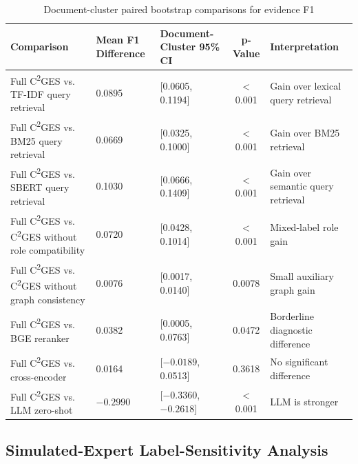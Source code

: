 \documentclass{article}
\begin{document}
\begin{table}[!ht]

\caption{Document-cluster paired bootstrap comparisons for evidence F1}
\label{tab:bootstrap}
\begin{tabular}{lllcl}
\toprule
\textbf{Comparison} & \textbf{Mean F1 Difference} & \textbf{Document-Cluster 95\% CI} & \textbf{p-Value} & \textbf{Interpretation} \\
\midrule
Full C\textsuperscript{2}GES vs. TF-IDF query retrieval & 0.0895 & [0.0605, 0.1194] & $<$0.001 & Gain over lexical query retrieval \\
Full C\textsuperscript{2}GES vs. BM25 query retrieval & 0.0669 & [0.0325, 0.1000] & $<$0.001 & Gain over BM25 retrieval \\
Full C\textsuperscript{2}GES vs. SBERT query retrieval & 0.1030 & [0.0666, 0.1409] & $<$0.001 & Gain over semantic query retrieval \\
Full C\textsuperscript{2}GES vs. C\textsuperscript{2}GES without role compatibility & 0.0720 & [0.0428, 0.1014] & $<$0.001 & Mixed-label role gain \\
Full C\textsuperscript{2}GES vs. C\textsuperscript{2}GES without graph consistency & 0.0076 & [0.0017, 0.0140] & 0.0078 & Small auxiliary graph gain \\
Full C\textsuperscript{2}GES vs. BGE reranker & 0.0382 & [0.0005, 0.0763] & 0.0472 & Borderline diagnostic difference \\
Full C\textsuperscript{2}GES vs. cross-encoder & 0.0164 & [$-0.0189$, 0.0513] & 0.3618 & No significant difference \\
Full C\textsuperscript{2}GES vs. LLM zero-shot & $-0.2990$ & [$-0.3360$, $-0.2618$] & $<$0.001 & LLM is stronger \\
\bottomrule
\end{tabular}
\end{table}

\subsection{Simulated-Expert Label-Sensitivity Analysis}
\label{sec:label_sensitivity}
\end{document}
